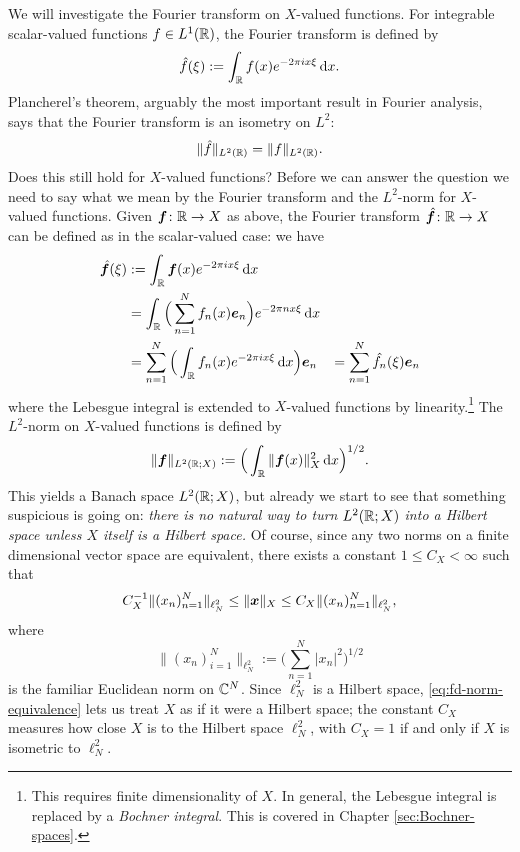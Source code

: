 We will investigate the Fourier transform on $X$-valued functions.
For integrable scalar-valued functions $f \in L^1(\mathbb{R})$, the Fourier transform is defined by
\begin{equation*}
  \hat{f}(\xi) := \int_{\mathbb{R}} f(x) e^{-2\pi i x \xi} \, \mathrm{d} x.
\end{equation*}
Plancherel's theorem, arguably the most important result in Fourier analysis, says that the Fourier transform is an isometry on $L^2$:
\begin{equation*}
  \|\hat{f}\|_{L^2(\mathbb{R})} = \|f\|_{L^2(\mathbb{R})}.
\end{equation*}
Does this still hold for $X$-valued functions?
Before we can answer the question we need to say what we mean by the Fourier transform and the $L^2$-norm for $X$-valued functions.
Given $\bm{f} \colon \mathbb{R} \rightarrow X$ as above, the Fourier transform $\hat{\bm{f}} \colon \mathbb{R} \rightarrow X$ can be defined as in the scalar-valued case: we have
\begin{equation*}
  \begin{aligned}
    \hat{\bm{f}}(\xi)
    &:= \int_{\mathbb{R}} \bm{f}(x) e^{-2\pi i x \xi} \, \mathrm{d} x \\
    &= \int_{\mathbb{R}} \Big( \sum_{n=1}^{N} f_{n}(x) \bm{e}_{n} \Big) e^{-2\pi n x \xi} \, \mathrm{d} x \\
    &= \sum_{n=1}^{N} \Big(\int_{\mathbb{R}} f_{n}(x) e^{-2\pi i x \xi} \, \mathrm{d} x \Big) \bm{e}_{n}
    &= \sum_{n=1}^{N} \hat{f_{n}}(\xi) \bm{e}_{n}
  \end{aligned}
\end{equation*}
where the Lebesgue integral is extended to $X$-valued functions by linearity.\footnote{This requires finite dimensionality of $X$. In general, the Lebesgue integral is replaced by a \emph{Bochner integral}. This is covered in Chapter \ref{sec:Bochner-spaces}.}
The $L^2$-norm on $X$-valued functions is defined by
\begin{equation*}
  \|\bm{f}\|_{L^2(\mathbb{R};X)} := \Big( \int_{\mathbb{R}} \|\bm{f}(x)\|_{X}^{2} \, \mathrm{d} x \Big)^{1/2}.
\end{equation*}
This yields a Banach space $L^2(\mathbb{R};X)$, but already we start to see that something suspicious is going on: \emph{there is no natural way to turn $L^2(\mathbb{R};X)$ into a Hilbert space unless $X$ itself is a Hilbert space.}
Of course, since any two norms on a finite dimensional vector space are equivalent, there exists a constant $1 \leq C_{X} < \infty$ such that
\begin{equation}\label{eq:fd-norm-equivalence}
  C_{X}^{-1} \|(x_{n})_{n=1}^{N}\|_{\ell^2_{N}} \leq \|\bm{x}\|_{X} \leq C_{X} \|(x_{n})_{n=1}^{N}\|_{\ell^2_{N}},
\end{equation}
where
\begin{equation*}
  \|(x_{n})_{i=1}^{N}\|_{\ell^2_{N}} := \Big( \sum_{n=1}^{N} |x_{n}|^{2} \Big)^{1/2}
\end{equation*}
is the familiar Euclidean norm on $\mathbb{C}^{N}$.
Since $\ell^{2}_{N}$ is a Hilbert space, \eqref{eq:fd-norm-equivalence} lets us treat $X$ as if it were a Hilbert space; the constant $C_{X}$ measures how close $X$ is to the Hilbert space $\ell^{2}_{N}$, with $C_{X} = 1$ if and only if $X$ is isometric to $\ell^{2}_{N}$.

